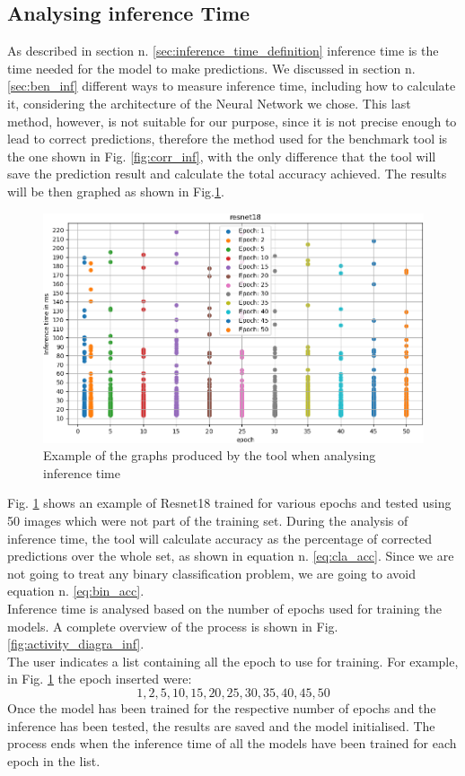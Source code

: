 \subsection{Analysing inference Time}
As described in section n. \ref{sec:inference_time_definition} inference time is the time needed for the model to make predictions. We discussed in section n. \ref{sec:ben_inf} different ways to measure inference time, including how to calculate it, considering the architecture of the Neural Network we chose. This last method, however, is not suitable for our purpose, since it is not precise enough to lead to correct predictions, therefore the method used for the benchmark tool is the one shown in Fig. \ref{fig:corr_inf}, with the only difference that the tool will save the prediction result and calculate the total accuracy achieved. The results will be then graphed as shown in Fig.\ref{fig:infere_graph}. 
\begin{figure}[h]
\centering
	    \includegraphics[width = \gw cm]{img/epoch_inferencetime.png}
        \caption{Example of the graphs produced by the tool when analysing inference time}
        \label{fig:infere_graph}
\end{figure}

Fig. \ref{fig:infere_graph} shows an example of Resnet18 trained for various epochs and tested using 50 images which were not part of the training set. 
During the analysis of inference time, the tool will calculate accuracy as the percentage of corrected predictions over the whole set, as shown in equation n. \ref{eq:cla_acc}. Since we are not going to treat any binary classification problem, we are going to avoid equation n. \ref{eq:bin_acc}. \\
Inference time is analysed based on the number of epochs used for training the models. A complete overview of the process is shown in Fig. \ref{fig:activity_diagra_inf}.\\
The user indicates a list containing all the epoch to use for training. For example, in Fig. \ref{fig:infere_graph} the epoch inserted were:
\[
1,2,5,10,15,20,25,30,35,40,45,50
\]
Once the model has been trained for the respective number of epochs and the inference has been tested, the results are saved and the model initialised. The process ends when the inference time of all the models have been trained for each epoch in the list. \\

